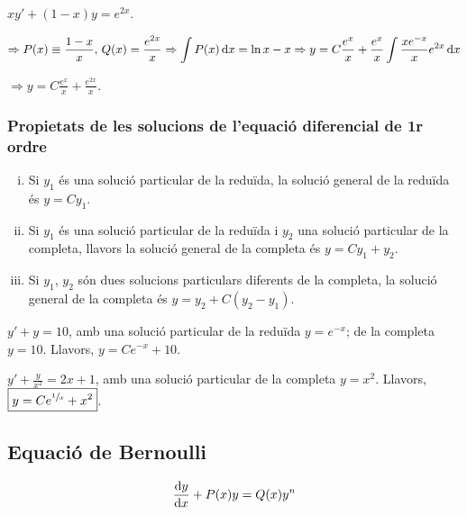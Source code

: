 \begin{example}
	$\displaystyle x y' + (1 - x) y = e^{2x}$.

	$\displaystyle \Rightarrow P(x) \equiv \frac{1 - x}{x}, \, Q(x) = \frac{e^{2x}}{x} \Rightarrow \int P(x) \mathop{}\!\mathrm{d} x = \ln x - x \Rightarrow y = C \frac{e^{x}}{x} + \frac{e^{x}}{x} \int \frac{x e^{-x}}{x} e^{2x} \mathop{}\!\mathrm{d} x$

	$\Rightarrow \boxed{y = C \frac{e^{x}}{x} + \frac{e^{2x}}{x}}$.
\end{example}

\subsubsection*{Propietats de les solucions de l'equació diferencial de 1r ordre}
\begin{enumerate}[i)]
	\item Si $y_{1}$ és una solució particular de la reduïda, la solució general de la reduïda és $y = C y_{1}$.
	\item Si $y_{1}$ és una solució particular de la reduïda i $y_{2}$ una solució particular de la completa, llavors la solució general de la completa és $y = C y_{1} + y_{2}$.
	\item Si $y_{1}$, $y_{2}$ són dues solucions particulars diferents de la completa, la solució general de la completa és $y = y_{2} + C(y_{2} - y_{1})$.
\end{enumerate}
\begin{example}
	$y' + y = 10$, amb una solució particular de la reduïda $y = e^{-x}$; de la completa $y = 10$. Llavors, $\boxed{y = C e^{-x} + 10}$.
\end{example}
\begin{example}
	$\displaystyle y' + \frac{y}{x^{2}} = 2x + 1$, amb una solució particular de la completa $y = x^{2}$. Llavors, $\boxed{y = C e^{\sfrac{1}{x}} + x^{2}}$.
\end{example}

\subsection{Equació de Bernoulli}
\begin{defi}
	\begin{align}
		\frac{\mathrm{d} y}{\mathrm{d} x} + P(x) y = Q(x) y^{n}
	\end{align}
\end{defi}

